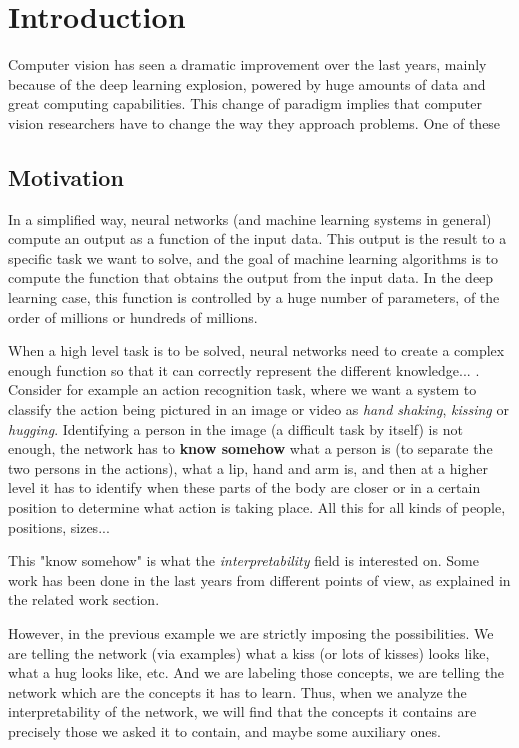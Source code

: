 \chapter{Introduction}
\label{chapter:introduction}

Computer vision has seen a dramatic improvement over the last years, mainly because of the deep learning explosion, powered by huge amounts of data and great computing capabilities. This change of paradigm implies that computer vision researchers have to change the way they approach problems. One of these 

\section{Motivation}
\label{section:motivation}

In a simplified way, neural networks (and machine learning systems in general) compute an output as a function of the input data. This output is the result to a specific task we want to solve, and the goal of machine learning algorithms is to compute the function that obtains the output from the input data. In the deep learning case, this function is controlled by a huge number of parameters, of the order of millions or hundreds of millions. 

When a high level task is to be solved, neural networks need to create a complex enough function so that it can correctly represent the different knowledge... . Consider for example an action recognition task, where we want a system to classify the action being pictured in an image or video as \textit{hand shaking}, \textit{kissing} or \textit{hugging}. Identifying a person in the image (a difficult task by itself) is not enough, the network has to \textbf{know somehow} what a person is (to separate the two persons in the actions), what a lip, hand and arm is, and then at a higher level it has to identify when these parts of the body are closer or in a certain position to determine what action is taking place. All this for all kinds of people, positions, sizes... 

This "know somehow" is what the \textit{interpretability} field is interested on. Some work has been done in the last years from different points of view, as explained in the related work section.

However, in the previous example we are strictly imposing the possibilities. We are telling the network (via examples) what a kiss (or lots of kisses) looks like, what a hug looks like, etc. And we are labeling those concepts, we are telling the network which are the concepts it has to learn. Thus, when we analyze the interpretability of the network, we will find that the concepts it contains are precisely those we asked it to contain, and maybe some auxiliary ones. 

